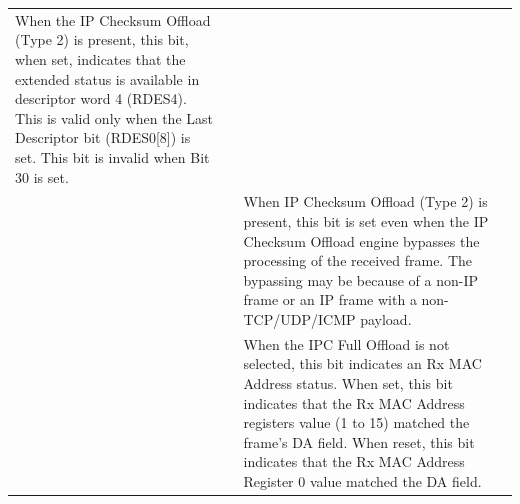 \documentclass[main\_\_EN.tex]{subfiles}
\begin{document}
\begin{longtable}[c]{ |p{1cm}|p{4cm}|p{10cm}| }
When the IP Checksum Offload (Type 2) is present, this bit, when set, indicates that the extended status is available in descriptor word 4 (RDES4). This is valid only when the Last Descriptor bit (RDES0[8]) is set. This bit is invalid when Bit 30 is set.\\
& & When IP Checksum Offload (Type 2) is present, this bit is set even when the IP Checksum Offload engine bypasses the processing of the received frame. The bypassing may be because of a non-IP frame or an IP frame with a non-TCP/UDP/ICMP payload.\\
& & When the IPC Full Offload is not selected, this bit indicates an Rx MAC Address status. When set, this bit indicates that the Rx MAC Address registers value (1 to 15) matched the frame’s DA field. When reset, this bit indicates that the Rx MAC Address Register 0 value matched the DA field.\\\hline

\end{longtable}
\end{document}
